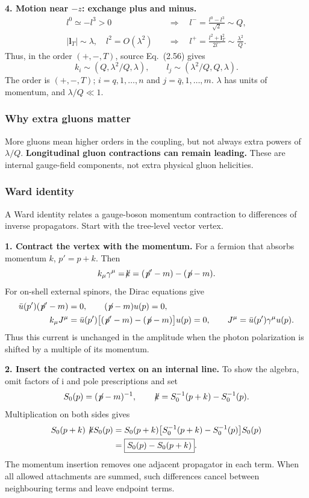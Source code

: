 \documentclass[14pt,a4paper]{extarticle}
\numberwithin{equation}{section}
\newcommand{\ii}{\mathrm i}
\newcommand{\slsh}[1]{\not\!#1}
\begin{document}
\textbf{4. Motion near $-z$: exchange plus and minus.}
\begin{align}
 l^0\simeq-l^3>0
 &\quad\Rightarrow\quad l^-=\frac{l^0-l^3}{\sqrt2}\sim Q,\\
 |\bm l_T|\sim\lambda,\quad l^2=O(\lambda^2)
 &\quad\Rightarrow\quad
 l^+=\frac{l^2+\bm l_T^2}{2l^-}\sim\frac{\lambda^2}{Q}.
\end{align}
Thus, in the order $(+,-,T)$, source Eq.~(2.56) gives
\begin{equation}
 \boxed{k_i\sim(Q,\lambda^2/Q,\lambda),\qquad
 l_j\sim(\lambda^2/Q,Q,\lambda).}
 \label{eq:notes-collinear-scaling}
\end{equation}
The order is $(+,-,T)$; $i=q,1,\ldots,n$ and $j=\bar q,1,\ldots,m$.
$\lambda$ has units of momentum, and $\lambda/Q\ll1$.


\subsubsection{Why extra gluons matter}
More gluons mean higher orders in the coupling, but not always extra
powers of $\lambda/Q$. \textbf{Longitudinal gluon contractions can remain leading.}
These are internal gauge-field components, not extra physical gluon helicities.


\subsubsection{Ward identity}
\label{sec:notes-ward-identity}
A Ward identity relates a gauge-boson momentum contraction to differences
of inverse propagators. Start with the tree-level vector vertex.

\textbf{1. Contract the vertex with the momentum.}
For a fermion that absorbs momentum $k$, $p'=p+k$. Then
\begin{equation}
 k_\mu\gamma^\mu=\slsh k
 =(\slsh p'-m)-(\slsh p-m).
\end{equation}
For on-shell external spinors, the Dirac equations give
\begin{align}
 \bar u(p')(\slsh p'-m)&=0,\qquad
 (\slsh p-m)u(p)=0,\\
 k_\mu J^\mu
 &=\bar u(p')\bigl[(\slsh p'-m)-(\slsh p-m)\bigr]u(p)
 =0,
 \qquad J^\mu=\bar u(p')\gamma^\mu u(p).
\end{align}
Thus this current is unchanged in the amplitude when the photon
polarization is shifted by a multiple of its momentum.

\textbf{2. Insert the contracted vertex on an internal line.}
To show the algebra, omit factors of $\ii$ and pole prescriptions and set
\begin{equation}
 S_0(p)=(\slsh p-m)^{-1},\qquad
 \slsh k=S_0^{-1}(p+k)-S_0^{-1}(p).
\end{equation}
Multiplication on both sides gives
\begin{align}
 S_0(p+k)\slsh k S_0(p)
 &=S_0(p+k)
 \bigl[S_0^{-1}(p+k)-S_0^{-1}(p)\bigr]S_0(p)\\
 &=\boxed{S_0(p)-S_0(p+k)}.
\end{align}
The momentum insertion removes one adjacent propagator in each term.
When all allowed attachments are summed, such differences cancel between
neighbouring terms and leave endpoint terms.
\end{document}

